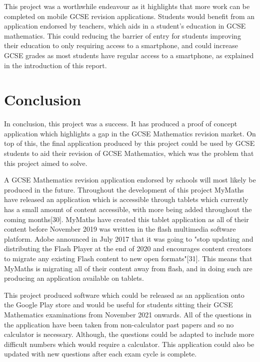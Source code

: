 \documentclass{article}
\begin{document}
This project was a worthwhile endeavour as it highlights that more work can be completed on mobile GCSE revision applications. Students would benefit from an application endorsed by teachers, which aids in a student's education in GCSE mathematics. This could reducing the barrier of entry for students improving their education to only requiring access to a smartphone, and could increase GCSE grades as most students have regular access to a smartphone, as explained in the introduction of this report. \par

\section{Conclusion}
\label{section:conclusion}

In conclusion, this project was a success. It has produced a proof of concept application which highlights a gap in the GCSE Mathematics revision market. On top of this, the final application produced by this project could be used by GCSE students to aid their revision of GCSE Mathematics, which was the problem that this project aimed to solve. \par

A GCSE Mathematics revision application endorsed by schools will most likely be produced in the future. Throughout the development of this project MyMaths have released an application which is accessible through tablets which currently has a small amount of content accessible, with more being added throughout the coming months[30]. MyMaths have created this tablet application as all of their content before November 2019 was written in the flash multimedia software platform. Adobe announced in July 2017 that it was going to "stop updating and distributing the Flash Player at the end of 2020 and encourages content creators to migrate any existing Flash content to new open formats"[31]. This means that MyMaths is migrating all of their content away from flash, and in doing such are producing an application available on tablets. \par

This project produced software which could be released as an application onto the Google Play store and would be useful for students sitting their GCSE Mathematics examinations from November 2021 onwards. All of the questions in the application have been taken from non-calculator past papers and so no calculator is necessary. Although, the questions could be adapted to include more difficult numbers which would require a calculator. This application could also be updated with new questions after each exam cycle is complete. \par
\end{document}
